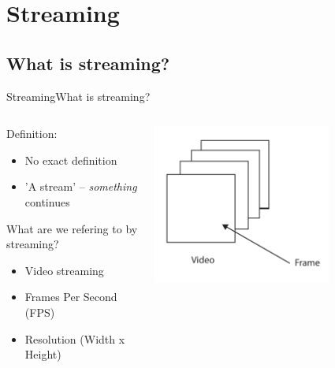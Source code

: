 \author{Thomas Kobber Panum}
\section{Streaming}
\subsection{What is streaming?}
\begin{frame}{Streaming}{What is streaming?}
  \begin{columns}[T]
    \begin{column}{.6\textwidth}
     \begin{block}{}
    Definition:
    \begin{itemize}
      \item No exact definition
      \item 'A stream' -- \textit{something} continues
    \end{itemize}
    What are we refering to by streaming?
    \begin{itemize}
      \item Video streaming
      \item Frames Per Second (FPS)
      \item Resolution (Width x Height)
    \end{itemize}
    \end{block}
    \end{column}
    \begin{column}{.4\textwidth}
      \begin{block}{}
        \begin{center}
          \includegraphics[width=0.7\textwidth]{images/video_structure.pdf}
        \end{center}
      \end{block}
    \end{column}
  \end{columns}
\end{frame}

